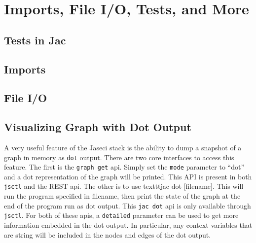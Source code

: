 \chapter{Imports, File I/O, Tests, and More}



\section{Tests in Jac}

\par
{}
\par
{}


\section{Imports}

\par
{}
\par
{}

\section{File I/O}

\par
{}

\par
\section{Visualizing Graph with Dot Output}

A very useful feature of the Jaseci stack is the ability to dump a snapshot of a graph in memory as \texttt{dot} output. There are two core interfaces to access this feature.  The first is the \texttt{graph get} api. Simply set the \texttt{mode} parameter to ``dot'' and a dot representation of the graph will be printed. This API is present in both \texttt{jsctl} and the REST api. The other is to use texttt{jac dot [filename]}. This will run the program specified in filename, then print the state of the graph at the end of the program run as dot output. This \texttt{jac dot} api is only available through \texttt{jsctl}. For both of these apis, a \texttt{detailed} parameter can be used to get more information embedded in the dot output. In particular, any context variables that are string will be included in the nodes and edges of the dot output.